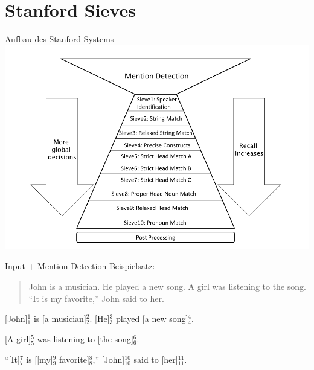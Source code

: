 \documentclass[11pt,a4paper]{beamer}
\begin{document}
\section{Stanford Sieves}
\begin{frame}{Aufbau des Stanford Systems}
\includegraphics[scale=0.29]{stanford.png}
\end{frame}



\begin{frame}{Input + Mention Detection}
Beispielsatz:
\begin{quote}
John is a musician. He played a new song. A girl was listening to the song. “It is my favorite,” John said to her.
\end{quote} 
\bigskip

[John]$^{1}_{1}$ is [a musician]$^{2}_{2}$. [He]$^{3}_{3}$ played [a new song]$^{4}_{4}$.

[A girl]$^{5}_{5}$ was listening to [the song]$^{6}_{6}$.

“[It]$^{7}_{7}$ is [[my]$^{9}_{9}$ favorite]$^{8}_{8}$,” [John]$^{10}_{10}$ said to [her]$^{11}_{11}$.

\end{frame}
\end{document}
